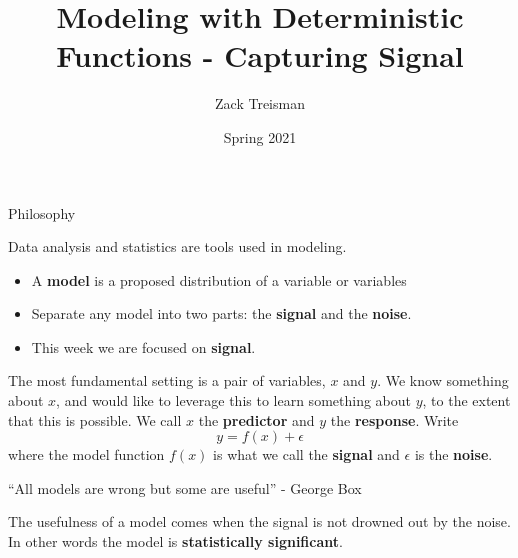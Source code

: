 \documentclass[
  ignorenonframetext,
]{beamer}
\title{Modeling with Deterministic Functions - Capturing Signal}
\author{Zack Treisman}
\date{Spring 2021}
\providecommand{\tightlist}{%
  \setlength{\itemsep}{0pt}\setlength{\parskip}{0pt}}
\begin{document}
\frame{\titlepage}

\begin{frame}{Philosophy}
\protect\hypertarget{philosophy}{}

Data analysis and statistics are tools used in modeling.

\begin{itemize}
\tightlist
\item
  A \textbf{model} is a proposed distribution of a variable or variables
\item
  Separate any model into two parts: the \textbf{signal} and the
  \textbf{noise}.
\item
  This week we are focused on \textbf{signal}.
\end{itemize}

The most fundamental setting is a pair of variables, \(x\) and \(y\). We
know something about \(x\), and would like to leverage this to learn
something about \(y\), to the extent that this is possible. We call
\(x\) the \textbf{predictor} and \(y\) the \textbf{response}. Write \[
y=f(x)+\epsilon
\] where the model function \(f(x)\) is what we call the \textbf{signal}
and \(\epsilon\) is the \textbf{noise}.

``All models are wrong but some are useful'' - George Box

The usefulness of a model comes when the signal is not drowned out by
the noise. In other words the model is \textbf{statistically
significant}.

\end{frame}
\end{document}
